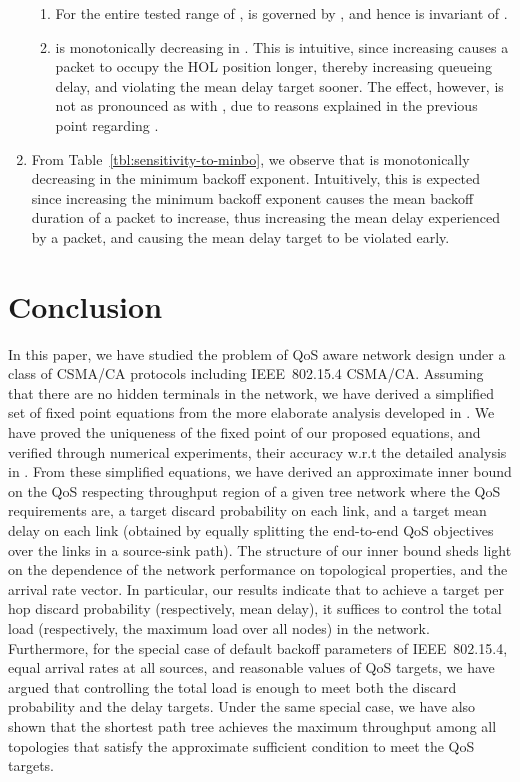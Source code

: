\documentclass[12pt, draftclsnofoot, onecolumn]{IEEEtran}
\begin{document}
\begin{enumerate}
\begin{enumerate}
\item For the entire tested range of ,  is governed by , and hence is invariant of .
\item  is monotonically decreasing in . This is intuitive, since increasing  causes a packet to occupy the HOL position longer, thereby increasing queueing delay, and violating the mean delay target sooner. The effect, however, is not as pronounced as with , due to reasons explained in the previous point regarding . 
\end{enumerate}
\item From Table~\ref{tbl:sensitivity-to-minbo}, we observe that  is monotonically decreasing in the minimum backoff exponent. Intuitively, this is expected since increasing the minimum backoff exponent causes the mean backoff duration of a packet to increase, thus increasing the mean delay experienced by a packet, and causing the mean delay target to be violated early. 
\end{enumerate}

 
\section{Conclusion}

In this paper, we have studied the problem of QoS aware network design under a class of CSMA/CA protocols including IEEE~802.15.4 CSMA/CA. Assuming that there are no hidden terminals in the network, we have derived a simplified set of fixed point equations from the more elaborate analysis developed in \cite{srivastava}. We have proved the uniqueness of the fixed point of our proposed equations, and verified through numerical experiments, their accuracy w.r.t the detailed analysis in \cite{srivastava}. From these simplified equations, we have derived an approximate inner bound on the QoS respecting throughput region of a given tree network where the QoS requirements are, a target discard probability on each link, and a target mean delay on each link (obtained by equally splitting the end-to-end QoS objectives over the links in a source-sink path). The structure of our inner bound sheds light on the dependence of the network performance on topological properties, and the arrival rate vector. In particular, our results indicate that to achieve a target per hop discard probability (respectively, mean delay), it suffices to control the total load (respectively, the maximum load over all nodes) in the network. Furthermore, for the special case of default backoff parameters of IEEE~802.15.4, equal arrival rates at all sources, and reasonable values of QoS targets, we have argued that controlling the total load is enough to meet both the discard probability and the delay targets. Under the same special case, we have also shown that the shortest path tree achieves the maximum throughput among all topologies that satisfy the approximate sufficient condition to meet the QoS targets. 
\end{document}
